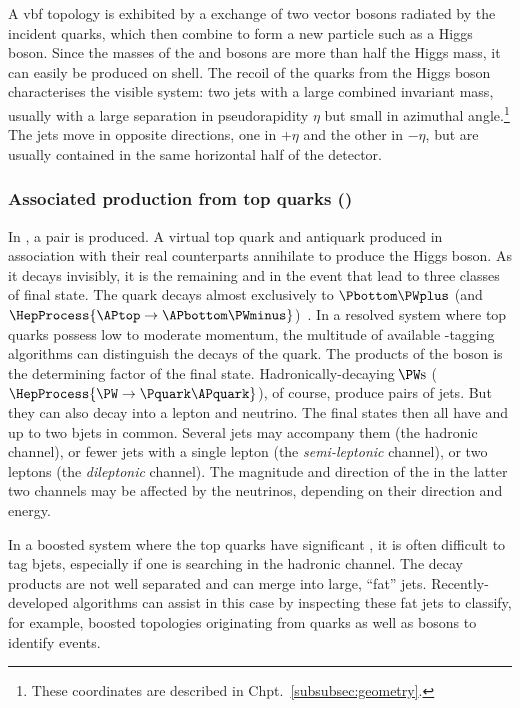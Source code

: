 A \acrshort{vbf} topology is exhibited by a \tchannel exchange of two vector bosons radiated by the incident quarks, which then combine to form a new particle such as a Higgs boson. Since the masses of the \PW and \PZ bosons are more than half the Higgs mass, it can easily be produced on shell. The recoil of the quarks from the Higgs boson characterises the visible system: two \glspl{jet} with a large combined invariant mass, usually with a large separation in pseudorapidity $\eta$ but small in azimuthal angle.\footnote{These coordinates are described in Chpt.~\ref{subsubsec:geometry}.} The \glspl{jet} move in opposite directions, one in $+\eta$ and the other in $-\eta$, but are usually contained in the same horizontal half of the detector.




\subsubsection{Associated production from top quarks (\texorpdfstring{\ttH}{ttH})}
\label{subsubsec:theory_hinv_ttH_mode}

In \ttH, a \ttbar pair is produced. A virtual top quark \Ptop and antiquark \APtop produced in association with their real counterparts annihilate to produce the Higgs boson. As it decays invisibly, it is the remaining \Ptop and \APtop in the event that lead to three classes of final state. The \Ptop quark decays almost exclusively to $\Pbottom\PWplus$ (and $\HepProcess{\APtop \to \APbottom\PWminus}$)~\cite{PhysRevD.98.030001}. In a resolved system where top quarks possess low to moderate momentum, the multitude of available \Pbottom-tagging algorithms can distinguish the decays of the \Pbottom quark. The products of the \PW boson is the determining factor of the final state. Hadronically-decaying $\mkern-2mu\PW\text{s}$ ($\HepProcess{\PW \to \Pquark\APquark}$), of course, produce pairs of \glspl{jet}. But they can also decay into a lepton and neutrino. The final states then all have \ptmiss and up to two \glspl{bjet} in common. Several \glspl{jet} may accompany them (the hadronic channel), or fewer \glspl{jet} with a single lepton (the \emph{semi-leptonic} channel), or two leptons (the \emph{dileptonic} channel). The magnitude and direction of the \ptmiss in the latter two channels may be affected by the neutrinos, depending on their direction and energy.

In a boosted system where the top quarks have significant \pt, it is often difficult to tag \glspl{bjet}, especially if one is searching in the hadronic channel. The decay products are not well separated and can merge into large, ``fat'' \glspl{jet}. Recently-developed algorithms can assist in this case by inspecting these fat \glspl{jet} to classify, for example, boosted topologies originating from \Ptop quarks as well as \PVec bosons to identify \ttH events.


